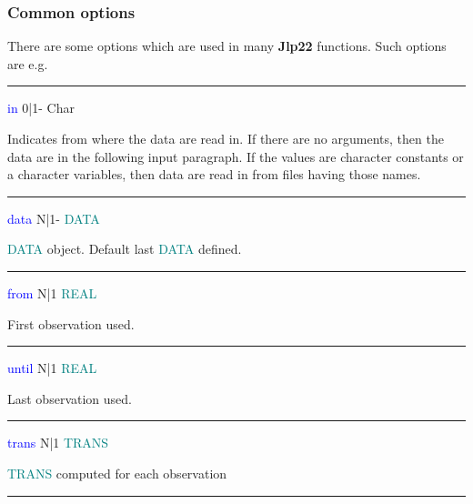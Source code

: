 {\subsubsection{Common options} 
\label{comoptions} 
There are some options which are used in many \textbf{Jlp22} functions. Such options are e.g. 
\vspace{0.3cm} 
\hrule 
\vspace{0.3cm} 
\noindent \textcolor{blue}{in} \tabto{3cm} 0|1- \tabto{5cm}  Char \tabto{7cm} 
\begin{changemargin}{3cm}{0cm} 
\noindent Indicates from where the data are read in. If there are no arguments, 
then the data are in the following input paragraph. If the values are 
character constants or a character variables, then data are read in from 
files having those names. 
\end{changemargin} 
\vspace{0.3cm} 
\hrule 
\vspace{0.3cm} 
\noindent \textcolor{blue}{data}  \tabto{3cm}  N|1-  \tabto{5cm}   \textcolor{teal}{DATA}  \tabto{7cm} 
\begin{changemargin}{3cm}{0cm} 
\noindent 	\textcolor{teal}{DATA} object. Default last \textcolor{teal}{DATA} defined. 
\end{changemargin} 
\vspace{0.3cm} 
\hrule 
\vspace{0.3cm} 
\noindent \textcolor{blue}{from} \tabto{3cm} N|1 \tabto{5cm}  \textcolor{teal}{REAL} \tabto{7cm} 
\begin{changemargin}{3cm}{0cm} 
\noindent  First observation used. 
\end{changemargin} 
\vspace{0.3cm} 
\hrule 
\vspace{0.3cm} 
\noindent \textcolor{blue}{until} \tabto{3cm} N|1 \tabto{5cm}  \textcolor{teal}{REAL} \tabto{7cm} 
\begin{changemargin}{3cm}{0cm} 
\noindent  Last observation used. 
\end{changemargin} 
\vspace{0.3cm} 
\hrule 
\vspace{0.3cm} 
\noindent \textcolor{blue}{trans} \tabto{3cm} N|1 \tabto{5cm}  \textcolor{teal}{TRANS} \tabto{7cm} 
\begin{changemargin}{3cm}{0cm} 
\noindent  \textcolor{teal}{TRANS} computed for each observation 
\end{changemargin} 
\vspace{0.3cm} 
\hrule 
\vspace{0.3cm} 
}
